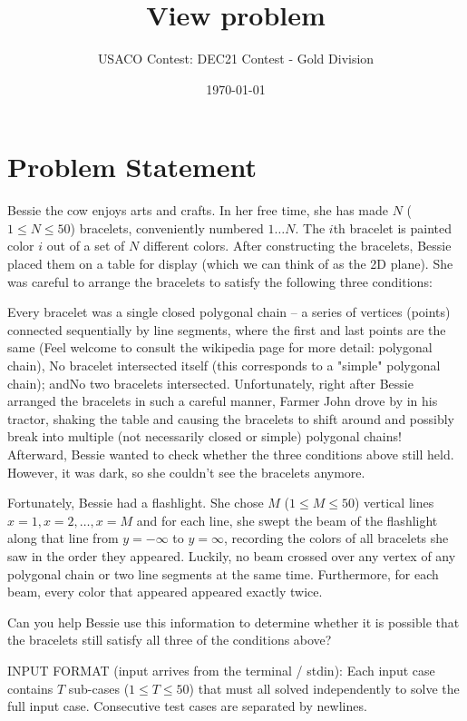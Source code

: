 \documentclass[12pt]{article}
\title{View problem}
\author{USACO Contest: DEC21 Contest - Gold Division}
\date{\today}
\begin{document}
\maketitle

\section*{Problem Statement}

Bessie the cow enjoys arts and crafts.  In her free time, she has made $N$
($1\le N\le 50$) bracelets, conveniently numbered $1 \ldots N$.  The $i$th
bracelet is painted color $i$ out of a set of $N$ different colors.  After
constructing the bracelets, Bessie  placed them on a table for display (which we
can think of as the 2D plane). She was careful to arrange the bracelets to
satisfy the following three conditions:

Every bracelet was a single closed polygonal chain -- a series of vertices
(points) connected sequentially by line segments, where the first and last
points are the same (Feel welcome to consult the wikipedia page for
more detail: polygonal chain),
No bracelet intersected itself (this corresponds to a "simple" polygonal
chain); andNo two bracelets intersected.
Unfortunately, right after Bessie arranged the bracelets in such a careful
manner, Farmer John drove by in his tractor, shaking the table and causing the
bracelets to shift around and possibly break into multiple (not necessarily
closed or simple) polygonal chains! Afterward, Bessie wanted to check whether
the three conditions above still held. However, it was dark, so she couldn't see
the bracelets anymore. 

Fortunately, Bessie had a flashlight. She chose $M$ ($1\le M\le 50$) vertical
lines $x=1, x=2, \ldots, x=M$ and for each line, she swept the beam of the
flashlight along that line from $y=-\infty$ to $y=\infty$, recording the colors
of all bracelets she saw in the order they appeared. Luckily, no beam crossed
over any vertex of any polygonal chain or two line segments at the same time.
Furthermore, for each beam, every color that appeared appeared exactly twice.

Can you help Bessie use this information to determine whether it is possible
that the bracelets still satisfy all three of the conditions above? 

INPUT FORMAT (input arrives from the terminal / stdin):
Each input case contains $T$ sub-cases ($1 \leq T \leq 50$) that must all solved
independently to solve the full input case. Consecutive test cases are 
separated by newlines.
\end{document}

